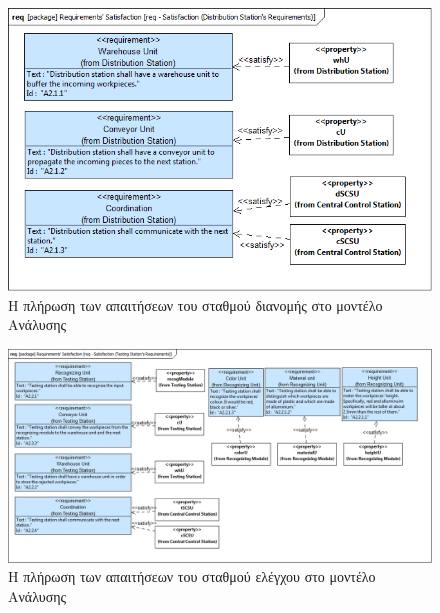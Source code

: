 \documentclass[a4paper,12pt,twoside]{report}
\begin{document}
{\begin{appendices}
			\begin{figure}[hp]
					\centering
					\includegraphics[scale=0.30]{AnalysisModel_req-Satisfaction(DistributionStationsRequirements).png}
					\caption{Η πλήρωση των απαιτήσεων του σταθμού διανομής στο μοντέλο Ανάλυσης}
					\label{φωτ:Η πλήρωση των απαιτήσεων του σταθμού διανομής στο μοντέλο Ανάλυσης}
			\end{figure}
			
			\begin{figure}[hp]
					\centering
					\includegraphics[scale=0.30]{AnalysisModel_req-Satisfaction(TestingStationsRequirements).png}
					\caption{Η πλήρωση των απαιτήσεων του σταθμού ελέγχου στο μοντέλο Ανάλυσης}
					\label{φωτ:Η πλήρωση των απαιτήσεων του σταθμού ελέγχου στο μοντέλο Ανάλυσης}
			\end{figure}
			

\end{appendices}}
\end{document}
